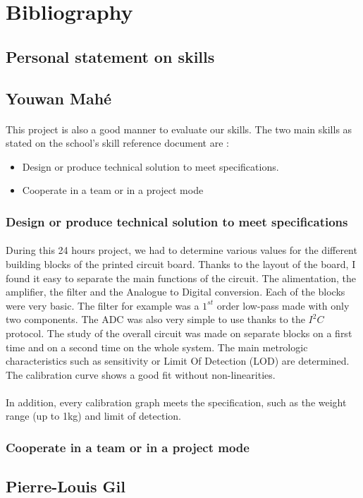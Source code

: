 \documentclass{article}[12pt]
\begin{document}
\section{Bibliography}


\newpage
\begin{appendices}
\section{Personal statement on skills}
\subsection{Youwan Mahé}
\paragraph{}
This project is also a good manner to evaluate our skills. The two main skills as stated on the school's skill reference document are :
\begin{itemize}
    \item Design or produce technical solution to meet specifications.
    \item Cooperate in a team or in a project mode
\end{itemize}
\subsubsection{Design or produce technical solution to meet specifications}
\paragraph{} 
During this 24 hours project, we had to determine various values for the different building blocks of the printed circuit board. Thanks to the layout of the board, I found it easy to separate the main functions of the circuit. The alimentation, the amplifier, the filter and the Analogue to Digital conversion. Each of the blocks were very basic. The filter for example was a $1^{st}$ order low-pass made with only two components. The ADC was also very simple to use thanks to the $I^2C$ protocol. The study of the overall circuit was made on separate blocks on a first time and on a second time on the whole system. The main metrologic characteristics such as sensitivity or Limit Of Detection (LOD) are determined. The calibration curve shows a good fit without non-linearities. 
\paragraph{}
In addition, every calibration graph meets the specification, such as the weight range (up to 1kg) and limit of detection.
\subsubsection{Cooperate in a team or in a project mode}
\subsection{Pierre-Louis Gil}
\end{appendices}
\end{document}

